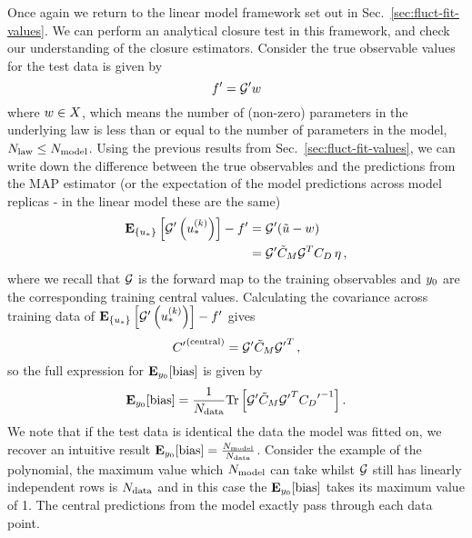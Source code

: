 Once again we return to the linear model framework set out in
Sec.~\ref{sec:fluct-fit-values}. We can perform an analytical closure test in
this framework, and check our understanding of the closure estimators. Consider
the true observable values for the test data is given by
\begin{equation}\label{eq:LinearLawMap}
    {{f}^{\prime}} = {{\mathcal{G}}^{\prime}} w
\end{equation}
where $w \in X$, which means the number of (non-zero)
parameters in the underlying law is less than or equal to the number of
parameters in the model, $N_{\rm law} \leq N_{\rm model}$. Using the previous results from
Sec.~\ref{sec:fluct-fit-values}, we can write down the difference between the
true observables and the predictions from the MAP estimator (or the expectation
of the model predictions across model replicas - in the linear model these are
the same)
\begin{equation}
    \begin{split}
        \mathbf{E}_{\{ u_* \}} \left[ {{\mathcal{G}}^{\prime}}\left(u_*^{(k)}\right) \right] - {{f}^{\prime}} &=
        {{\mathcal{G}}^{\prime}} (\tilde{u} - w ) \\
        &= {{\mathcal{G}}^{\prime}} \tilde{C}_M \mathcal{G}^T C_{D} \, \eta \, ,
    \end{split}
\end{equation}
where we recall that $\mathcal{G}$ is the forward map to the training observables
and $y_0$ are the corresponding training central values. Calculating
the covariance across training data of
$\mathbf{E}_{\{ u_* \}} \left[ {{\mathcal{G}}^{\prime}}\left(u_*^{(k)}\right) \right] - {{f}^{\prime}}$ gives
\begin{equation}
    {{C}^{\prime}}^{(\rm central)} = {{\mathcal{G}}^{\prime}} \tilde{C}_M {{\mathcal{G}}^{\prime}}^T \, ,
\end{equation}
so the full expression for $\mathbf{E}_{y_0}[{\rm bias}]$ is given by
\begin{equation}\label{eq:BiasLinearModel}
    \mathbf{E}_{y_0}[{\rm bias}] = \frac{1}{N_{\rm data}}
    {\rm Tr} \left[
        {{\mathcal{G}}^{\prime}} \tilde{C}_M {{\mathcal{G}}^{\prime}}^T
        {{C_{D}}^{\prime}}^{-1}
    \right].
\end{equation}
We note that if the test data is identical the data the model was fitted on, we
recover an intuitive result $\mathbf{E}_{y_0}[{\rm bias}] =
\frac{N_{\rm model}}{N_{\rm data}}$. Consider the example of the polynomial, the maximum
value which $N_{\rm model}$ can take whilst $\mathcal{G}$ still has linearly independent
rows is $N_{\rm data}$ and in this case the $\mathbf{E}_{y_0}[{\rm bias}]$
takes its maximum value of 1. The central predictions from the model exactly
pass through each data point.

